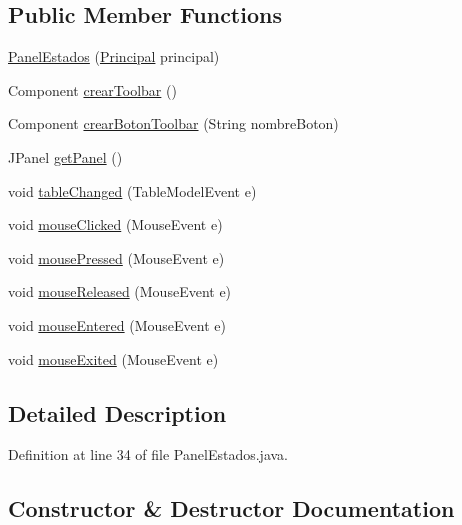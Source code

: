 \subsection*{Public Member Functions}
\begin{DoxyCompactItemize}
\item 
\mbox{\hyperlink{classpaneles_1_1_panel_estados_a58b73ebb992e4dd681a60d7d1d8497c2}{Panel\+Estados}} (\mbox{\hyperlink{classvistas_1_1_principal}{Principal}} principal)
\item 
Component \mbox{\hyperlink{classpaneles_1_1_panel_estados_ae62e5c6656177ec67c97cc2fe48d1e54}{crear\+Toolbar}} ()
\item 
Component \mbox{\hyperlink{classpaneles_1_1_panel_estados_af627b3edddac65046fd93dc774904597}{crear\+Boton\+Toolbar}} (String nombre\+Boton)
\item 
J\+Panel \mbox{\hyperlink{classpaneles_1_1_panel_estados_a8f949a32d4a35371a2f2b37a66ede21c}{get\+Panel}} ()
\item 
void \mbox{\hyperlink{classpaneles_1_1_panel_estados_a317a78c32717a2c06cbb82f990e411ff}{table\+Changed}} (Table\+Model\+Event e)
\item 
void \mbox{\hyperlink{classpaneles_1_1_panel_estados_a2042bfd835f4ceea6a1e055cc388add5}{mouse\+Clicked}} (Mouse\+Event e)
\item 
void \mbox{\hyperlink{classpaneles_1_1_panel_estados_a4bb90c78460058ff38dd8d70d4bc4db8}{mouse\+Pressed}} (Mouse\+Event e)
\item 
void \mbox{\hyperlink{classpaneles_1_1_panel_estados_a1a35a3b4c3144a440153fccd3da616fd}{mouse\+Released}} (Mouse\+Event e)
\item 
void \mbox{\hyperlink{classpaneles_1_1_panel_estados_a6636a93391632082ad778cea6d6189b7}{mouse\+Entered}} (Mouse\+Event e)
\item 
void \mbox{\hyperlink{classpaneles_1_1_panel_estados_a1e46995f291f6fbbb7686c141a24d4da}{mouse\+Exited}} (Mouse\+Event e)
\end{DoxyCompactItemize}


\subsection{Detailed Description}


Definition at line 34 of file Panel\+Estados.\+java.



\subsection{Constructor \& Destructor Documentation}
\mbox{\label{classpaneles_1_1_panel_estados_a58b73ebb992e4dd681a60d7d1d8497c2}} 
